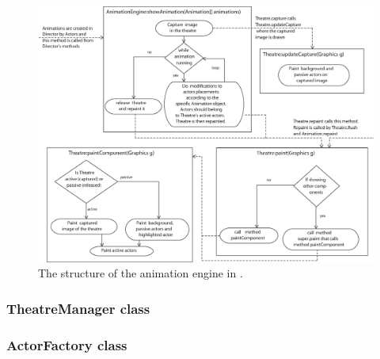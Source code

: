 \begin{figure}[!htb]
\begin{center}
\includegraphics[width=\textwidth]{images/jeliot_animation_engine3.eps}
\caption{The structure of the animation engine in \jel{}.}
\label{fig:jeliot3_animation_engine}
\end{center}
\end{figure}

\subsubsection{TheatreManager class}


\subsubsection{ActorFactory class}

